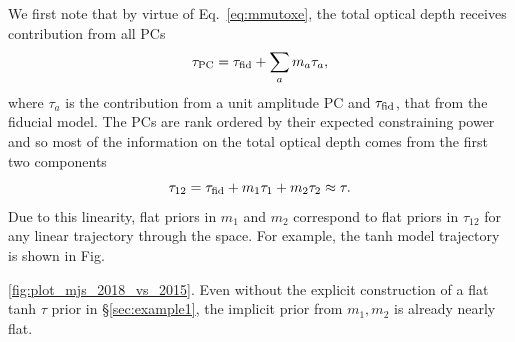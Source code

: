 \documentclass[prd,twocolumn,amsmath,amssymb,floatfix,superscriptaddress,nofootinbib]{revtex4-1}
\newcommand{\beq}{\begin{equation}}
\newcommand{\eeq}{\end{equation}}
\begin{document}
{ We first note that by virtue of Eq.~\ref{eq:mmutoxe}, the total optical depth receives contribution from all PCs
\beq
\tau_{\rm PC} = \tau_{\rm fid} + \sum_a m_a \tau_a,
\eeq
where $\tau_a$ is the contribution from a unit amplitude PC and $\tau_{\rm fid}$, that from the fiducial model.
The PCs are rank ordered by their expected constraining power and so most of the information on the total optical depth comes from
the first two components
\beq
\tau_{12} = \tau_{\rm fid} + m_1 \tau_1 + m_2 \tau_2 \approx \tau.
\eeq
%
%
Due to this linearity, flat priors in $m_1$ and $m_2$ correspond to
flat priors in $\tau_{12}$ for any linear trajectory through the space.   For example, the tanh model trajectory is shown in Fig.~{\ref{fig:plot_mjs_2018_vs_2015}.   Even without the explicit 
construction of a flat tanh $\tau$ prior in \S \ref{sec:example1}, 
the implicit prior from $m_1,m_2$ is already nearly flat.

}}
\end{document}
